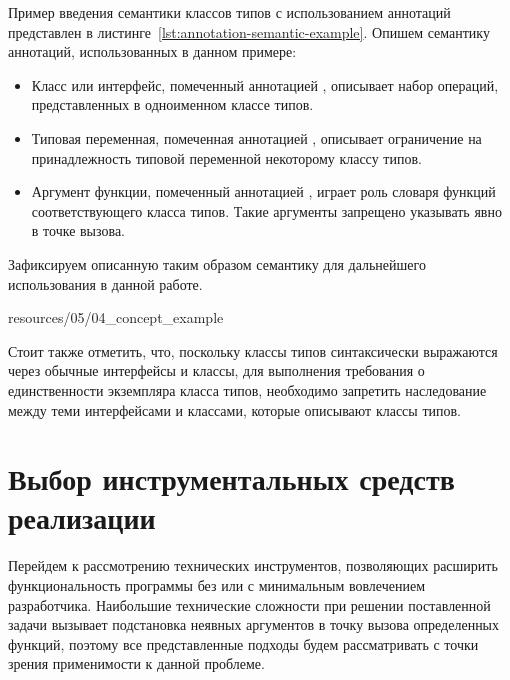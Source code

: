 Пример введения семантики классов типов с использованием аннотаций представлен в листинге~\ref{lst:annotation-semantic-example}. Опишем семантику аннотаций, использованных в данном примере:
\begin{itemize}
    \item Класс или интерфейс, помеченный аннотацией , описывает набор операций, представленных в одноименном классе типов.
    \item Типовая переменная, помеченная аннотацией , описывает ограничение на принадлежность типовой переменной некоторому классу типов.
    \item Аргумент функции, помеченный аннотацией , играет роль словаря функций соответствующего класса типов. Такие аргументы запрещено указывать явно в точке вызова. 
\end{itemize}
Зафиксируем описанную таким образом семантику для дальнейшего использования в данной работе. 


{resources/05/04_concept_example}

Стоит также отметить, что, поскольку классы типов синтаксически выражаются через обычные интерфейсы и классы, для выполнения требования о единственности экземпляра класса типов, необходимо запретить наследование между теми интерфейсами и классами, которые описывают классы типов. 

\section{Выбор инструментальных средств реализации}

Перейдем к рассмотрению технических инструментов, позволяющих расширить функциональность программы без или с минимальным вовлечением разработчика. Наибольшие технические сложности при решении поставленной задачи вызывает подстановка неявных аргументов в точку вызова определенных функций, поэтому все представленные подходы будем рассматривать с точки зрения применимости к данной проблеме.

